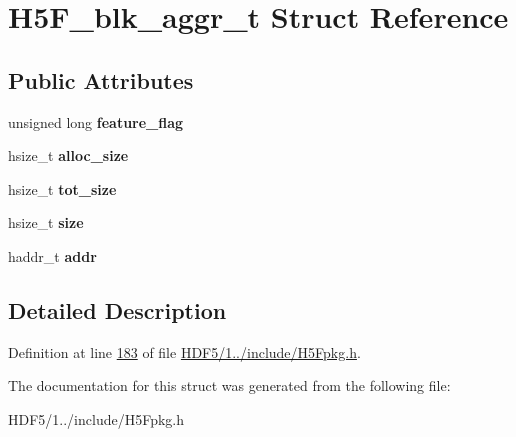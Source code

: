 \hypertarget{struct_h5_f__blk__aggr__t}{}\section{H5\+F\+\_\+blk\+\_\+aggr\+\_\+t Struct Reference}
\label{struct_h5_f__blk__aggr__t}
\subsection*{Public Attributes}
\begin{DoxyCompactItemize}
\item 
\mbox{\label{struct_h5_f__blk__aggr__t_a14e0502672644c64df0e85c66221c626}} 
unsigned long {\bfseries feature\+\_\+flag}
\item 
\mbox{\label{struct_h5_f__blk__aggr__t_a3d403ea8b1e801058781fd99d3a020ee}} 
hsize\+\_\+t {\bfseries alloc\+\_\+size}
\item 
\mbox{\label{struct_h5_f__blk__aggr__t_ad5dfb8b0e98b8fc79065ed8152c3bf94}} 
hsize\+\_\+t {\bfseries tot\+\_\+size}
\item 
\mbox{\label{struct_h5_f__blk__aggr__t_a6e4d2dd96db41d2aad6d9acb1acc1c3d}} 
hsize\+\_\+t {\bfseries size}
\item 
\mbox{\label{struct_h5_f__blk__aggr__t_ae4e821526c8e0c4cefc2af2caff0bae4}} 
haddr\+\_\+t {\bfseries addr}
\end{DoxyCompactItemize}


\subsection{Detailed Description}


Definition at line \hyperlink{_h_d_f5_21_810_81_2include_2_h5_fpkg_8h_source_l00183}{183} of file \hyperlink{_h_d_f5_21_810_81_2include_2_h5_fpkg_8h_source}{H\+D\+F5/1../include/\+H5\+Fpkg.\+h}.



The documentation for this struct was generated from the following file\+:\begin{DoxyCompactItemize}
\item 
H\+D\+F5/1../include/\+H5\+Fpkg.\+h\end{DoxyCompactItemize}
